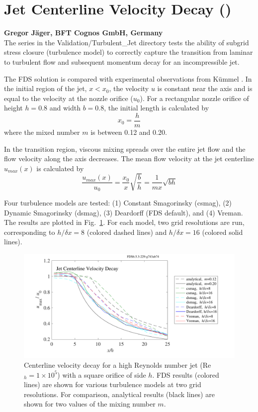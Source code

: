 \documentclass[11pt]{book}
\begin{document}
\clearpage


\section{Jet Centerline Velocity Decay (\texorpdfstring{}{jet})}

\textbf{Gregor J\"ager, BFT Cognos GmbH, Germany}\\

\noindent The  series in the Validation/Turbulent\_Jet directory tests the ability of subgrid stress closure (turbulence model) to correctly capture the transition from laminar to turbulent flow and subsequent momentum decay for an incompressible jet.

The FDS solution is compared with experimental observations from K\"ummel \cite{Kummel:2007}. In the initial region of the jet, $x<x_0$, the velocity $u$ is constant near the axis and is equal to the velocity at the nozzle orifice ($u_0$). For a rectangular nozzle orifice of height $h = 0.8$ and width $b = 0.8$, the initial length is calculated by
\begin{equation}
x_0 = \frac{h}{m}
\end{equation}
where the mixed number $m$ is between 0.12 and 0.20.

In the transition region, viscous mixing spreads over the entire jet flow and the flow velocity along the axis decreases. The mean flow velocity at the jet centerline $u_{max}(x)$ is calculated by
\begin{equation}
\frac{u_{max}(x)}{u_0} = \frac{x_0}{x}\sqrt{\frac{b}{h}} = \frac{1}{mx} \sqrt{bh}
\end{equation}

Four turbulence models are tested: (1) Constant Smagorinsky (csmag), (2) Dynamic Smagorinsky (dsmag), (3) Deardorff (FDS default), and (4) Vreman.  The results are plotted in Fig.~\ref{fig_jet_decay}. For each model, two grid resolutions are run, corresponding to $h/\delta x = 8$ (colored dashed lines) and $h/\delta x=16$ (colored solid lines).
\begin{figure}[h]
\centering
\includegraphics[width=.8\textwidth]{SCRIPT_FIGURES/jet_decay}
\caption[Jet centerline velocity decay]{Centerline velocity decay for a high Reynolds number jet (Re$_h = 1 \times 10^5$) with a square orifice of side $h$.  FDS results (colored lines) are shown for various turbulence models at two grid resolutions.  For comparison, analytical results (black lines) are shown for two values of the mixing number $m$.}
\label{fig_jet_decay}
\end{figure}
\end{document}
